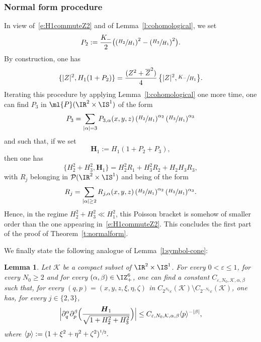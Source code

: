 \documentclass[JEP,XML,SOM,Unicode, NoEqCountersInSection,published]{cedram}
\theoremstyle{plain}
\newtheorem{lemm}[theo]{Lemma}
\theoremstyle{definition}
\theoremstyle{remark}
\begin{document}
\subsubsection{Normal form procedure}
In view of~\eqref{e:H1commuteZ2} and of Lemma~\ref{l:cohomological}, we set
\[
P_2:=\frac{K_-}{2}\bigl(\left(\sfrac{H_2}{H_1}\right)^2-\left(\sfrac{H_3}{H_1}\right)^2\bigr).
\]
By construction, one has
\[
\{|Z|^2,H_1(1 + P_2)\}=\frac{(Z^2+\overline{Z}^2)}{4}\,\bigl\{|Z|^2,\sfrac{K_-}{H_1}\bigr\}.
\]
Iterating this procedure by applying Lemma~\ref{l:cohomological} one more time, one can find $P_3$ in $\ml{P}(\IR^2\times\IS^1)$ of the form
\[
P_3=\sum_{|\alpha|=3}P_{3,\alpha}(x,y,z)\left(\sfrac{H_2}{H_1}\right)^{\alpha_2}\left(\sfrac{H_3}{H_1}\right)^{\alpha_3}
\]
and such that, if we set
\begin{equation}\label{e:normalform-H1}
\boldsymbol{H}_1:=H_1\left(1+P_2 +P_3\right),
\end{equation}
then one has
\begin{equation}\label{e:H1commuteZ2-normalform}
\{H_2^2+H_3^2,\boldsymbol{H}_1\}=H_2^2 R_1+H_3^{2} R_2+H_2H_3 R_3,
\end{equation}
with $R_j$ belonging in $\mathcal{P}(\IR^2\times\IS^1)$ and being of the form
\[
R_j=\sum_{|\alpha|\geq 2}R_{j,\alpha}(x,y,z)\left(\sfrac{H_2}{H_1}\right)^{\alpha_2}(\sfrac{H_3}{H_1})^{\alpha_3}.
\]
Hence, in the regime $H_2^2+H_3^2\ll H_1^2$, this Poisson bracket is somehow of smaller order than the one appearing in~\eqref{e:H1commuteZ2}. This concludes the first part of the proof of Theorem~\ref{t:normalform}.

We finally state the following analogue of Lemma~\ref{l:symbol-cone}:

\begin{lemm}\label{l:symbol-cone-normalform} Let $\mathcal{K
}$ be a compact subset of $\IR^2\times\IS^1$. For every $0<\varepsilon\leq 1$, for every $N_0\geq 2$ and for every $(\alpha,\beta)\in\IZ_+^6$, one can find a constant $C_{\varepsilon, N_0, \mathcal{K}, \alpha,\beta}$ such that, for every $(q,p)=(x,y,z,\xi,\eta,\zeta)$ in $C_{2^{N_0}\varepsilon}(\mathcal{K})\setminus C_{2^{-N_0}\varepsilon}(\mathcal{K})$, one has, for every $j\in\{2,3\}$,
\[
\Bigl|\partial^\alpha_{q}\partial_{p}^\beta \Bigl(\frac{\boldsymbol{H}_1}{\sqrt{1+H_2^2+H_3^2}}\Bigr)\Bigr|\leq C_{\varepsilon, N_0, \mathcal{K},\alpha,\beta}\langle p\rangle^{-|\beta|},
\]
where $\langle p\rangle:=(1+\xi^2+\eta^2+\zeta^2)^{\sfrac{1}{2}}.$
\end{lemm}
\end{document}
